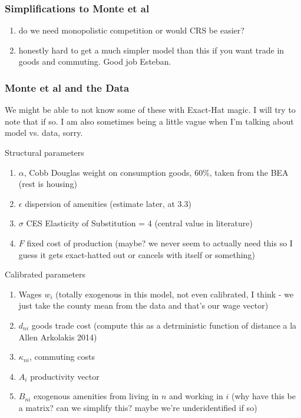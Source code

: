 \documentclass{article}
\begin{document}
\subsubsection{Simplifications to Monte et al}
\begin{enumerate}
\item do we need monopolistic competition or would CRS be easier? 
\item honestly hard to get a much simpler model than this if you want trade in goods and commuting. Good job Esteban.
\end{enumerate}

\subsubsection{Monte et al and the Data}
We might be able to not know some of these with Exact-Hat magic. I will try to note that if so.
I am also sometimes being a little vague when I'm talking about model vs. data, sorry.

Structural parameters
\begin{enumerate}
\item $\alpha$, Cobb Douglas weight on consumption goods, 60\%, taken from the BEA (rest is housing)
\item $\epsilon$ dispersion of amenities (estimate later, at 3.3)
\item $\sigma$ CES Elasticity of Substitution = 4 (central value in literature)
\item $F$ fixed cost of production (maybe? we never seem to actually need this so I guess it gets exact-hatted out or cancels with itself or something)
\end{enumerate}
Calibrated parameters
\begin{enumerate}
\item Wages $w_i$ (totally exogenous in this model, not even calibrated, I think - we just take the county mean from the data and that's our wage vector)
\item $d_{ni}$ goods trade cost (compute this as a detrministic function of distance a la Allen Arkolakis 2014)
\item $\kappa_{ni}$, commuting costs
\item $A_i$ productivity vector
\item $B_{ni}$ exogenous amenities from living in $n$ and working in $i$ (why have this be a matrix? can we simplify this? maybe we're underidentified if so)
\end{enumerate} 
\end{document}
